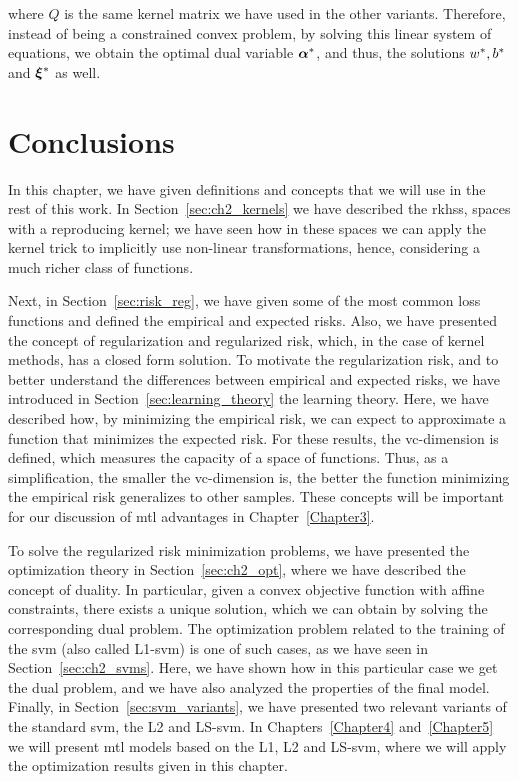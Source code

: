 where $Q$ is the same kernel matrix we have used in the other variants.
Therefore, instead of being a constrained convex problem, by solving this linear system of equations, we obtain the optimal dual variable ${\bm{\alpha}}^*$, and thus, the solutions ${w}^*, {b}^*$ and ${\bm{\xi}}^*$ as well.

\section{Conclusions}\label{sec-conclusions-1}

In this chapter, we have given definitions and concepts that we will use in the rest of this work. In Section~\ref{sec:ch2_kernels} we have described the \acrshort{rkhss}, spaces with a reproducing kernel; we have seen how in these spaces we can apply the kernel trick to implicitly use non-linear transformations, hence, considering a much richer class of functions.

%
Next, in Section~\ref{sec:risk_reg}, we have given some of the most common loss functions and defined the empirical and expected risks. 
Also, we have presented the concept of regularization and regularized risk, which, in the case of kernel methods, has a closed form solution.
%
To motivate the regularization risk, and to better understand the differences between empirical and expected risks, we have introduced in Section~\ref{sec:learning_theory} the learning theory. Here, we have described how, by minimizing the empirical risk, we can expect to approximate a function that minimizes the expected risk. For these results, the \acrshort{vc}-dimension is defined, which measures the capacity of a space of functions. Thus, as a simplification, the smaller the \acrshort{vc}-dimension is, the better the function minimizing the empirical risk generalizes to other samples.
These concepts will be important for our discussion of \acrfull{mtl} advantages in Chapter~\ref{Chapter3}.

%
To solve the regularized risk minimization problems, we have presented the optimization theory in Section~\ref{sec:ch2_opt}, where we have described the concept of duality. In particular, given a convex objective function with affine constraints, there exists a unique solution, which we can obtain by solving the corresponding dual problem.
%
The optimization problem related to the training of the \acrshort{svm} (also called L1-\acrshort{svm}) is one of such cases, as we have seen in Section~\ref{sec:ch2_svms}. Here, we have shown how in this particular case we get the dual problem, and we have also analyzed the properties of the final model.
%
Finally, in Section~\ref{sec:svm_variants}, we have presented two relevant variants of the standard \acrshort{svm}, the L2 and LS-\acrshort{svm}.
%
In Chapters~\ref{Chapter4} and~\ref{Chapter5} we will present \acrshort{mtl} models based on the L1, L2 and LS-\acrshort{svm}, where we will apply the optimization results given in this chapter.
